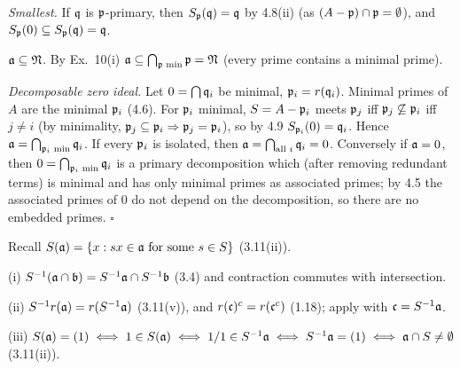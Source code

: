 \documentclass[11pt]{article}
\begin{document}
\emph{Smallest.} If $\mathfrak q$ is $\mathfrak p$-primary, then $S_\mathfrak p(\mathfrak q)=\mathfrak q$ by 4.8(ii) (as $(A-\mathfrak p)\cap\mathfrak p=\emptyset$), and $S_\mathfrak p(0)\subseteq S_\mathfrak p(\mathfrak q)=\mathfrak q$.

\emph{$\mathfrak a\subseteq\mathfrak N$.} By Ex.~10(i) $\mathfrak a\subseteq\bigcap_{\mathfrak p\text{ min}}\mathfrak p=\mathfrak N$ (every prime contains a minimal prime).

\emph{Decomposable zero ideal.} Let $0=\bigcap\mathfrak q_i$ be minimal, $\mathfrak p_i=r(\mathfrak q_i)$. Minimal primes of $A$ are the minimal $\mathfrak p_i$ (4.6). For $\mathfrak p_i$ minimal, $S=A-\mathfrak p_i$ meets $\mathfrak p_j$ iff $\mathfrak p_j\not\subseteq\mathfrak p_i$ iff $j\ne i$ (by minimality, $\mathfrak p_j\subseteq\mathfrak p_i\Rightarrow\mathfrak p_j=\mathfrak p_i$), so by 4.9 $S_{\mathfrak p_i}(0)=\mathfrak q_i$. Hence $\mathfrak a=\bigcap_{\mathfrak p_i\text{ min}}\mathfrak q_i$.
If every $\mathfrak p_i$ is isolated, then $\mathfrak a=\bigcap_{\text{all }i}\mathfrak q_i=0$. Conversely if $\mathfrak a=0$, then $0=\bigcap_{\mathfrak p_i\text{ min}}\mathfrak q_i$ is a primary decomposition which (after removing redundant terms) is minimal and has only minimal primes as associated primes; by 4.5 the associated primes of $0$ do not depend on the decomposition, so there are no embedded primes. \hfill$\square$

\pf
Recall $S(\mathfrak a)=\{x:sx\in\mathfrak a\text{ for some }s\in S\}$ (3.11(ii)).

(i) $S^{-1}(\mathfrak a\cap\mathfrak b)=S^{-1}\mathfrak a\cap S^{-1}\mathfrak b$ (3.4) and contraction commutes with intersection.

(ii) $S^{-1}r(\mathfrak a)=r(S^{-1}\mathfrak a)$ (3.11(v)), and $r(\mathfrak c)^c=r(\mathfrak c^c)$ (1.18); apply with $\mathfrak c=S^{-1}\mathfrak a$.

(iii) $S(\mathfrak a)=(1)\iff1\in S(\mathfrak a)\iff1/1\in S^{-1}\mathfrak a\iff S^{-1}\mathfrak a=(1)\iff\mathfrak a\cap S\ne\emptyset$ (3.11(ii)).
\end{document}
